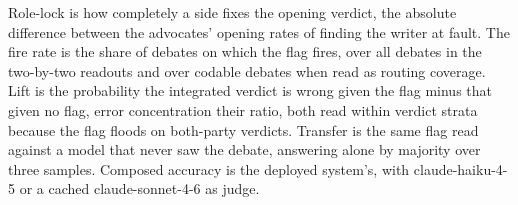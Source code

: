 Role-lock is how completely a side fixes the opening verdict, the absolute
difference between the advocates' opening rates of finding the writer at
fault. %
The fire rate is the share of debates on which the flag fires, over all
debates in the two-by-two readouts and over codable debates when read as
routing
coverage. %
Lift is the probability the integrated verdict is wrong given the flag
minus that given no flag, error concentration their ratio, both read
within verdict strata because the flag floods on both-party
verdicts. %
Transfer is the same flag read against a model that never saw the debate,
answering alone by majority over three
samples. %
Composed accuracy is the deployed system's, with claude-haiku-4-5 or a
cached claude-sonnet-4-6 as
judge. %
